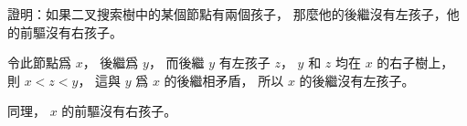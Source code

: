 \startEXERCISE
證明：如果二叉搜索樹中的某個節點有兩個孩子，
那麼他的後繼沒有左孩子，他的前驅沒有右孩子。
\stopEXERCISE

\startANSWER
令此節點爲 $x$，
後繼爲 $y$，
而後繼 $y$ 有左孩子 $z$，
 $y$ 和 $z$ 均在 $x$ 的右子樹上，
則 $x < z < y$，
這與 $y$ 爲 $x$ 的後繼相矛盾，
所以 $x$ 的後繼沒有左孩子。

同理， $x$ 的前驅沒有右孩子。
\stopANSWER
